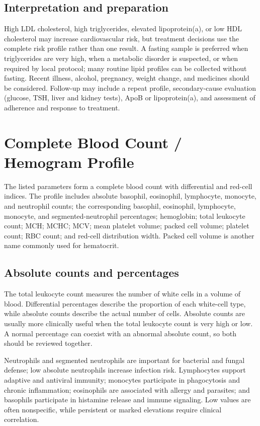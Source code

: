 \documentclass[11pt,openany]{book}
\begin{document}
\subsection*{Interpretation and preparation}
High LDL cholesterol, high triglycerides, elevated lipoprotein(a), or low HDL
cholesterol may increase cardiovascular risk, but treatment decisions use the
complete risk profile rather than one result. A fasting sample is preferred
when triglycerides are very high, when a metabolic disorder is suspected, or
when required by local protocol; many routine lipid profiles can be collected
without fasting. Recent illness, alcohol, pregnancy, weight change, and
medicines should be considered. Follow-up may include a repeat profile,
secondary-cause evaluation (glucose, TSH, liver and kidney tests), ApoB or
lipoprotein(a), and assessment of adherence and response to treatment.

\section{Complete Blood Count / Hemogram Profile}

The listed parameters form a complete blood count with differential and red-cell
indices. The profile includes absolute basophil, eosinophil, lymphocyte,
monocyte, and neutrophil counts; the corresponding basophil, eosinophil,
lymphocyte, monocyte, and segmented-neutrophil percentages; hemoglobin; total
leukocyte count; MCH; MCHC; MCV; mean platelet volume; packed cell volume;
platelet count; RBC count; and red-cell distribution width. Packed cell volume
is another name commonly used for hematocrit.

\subsection*{Absolute counts and percentages}
The total leukocyte count measures the number of white cells in a volume of
blood. Differential percentages describe the proportion of each white-cell
type, while absolute counts describe the actual number of cells. Absolute
counts are usually more clinically useful when the total leukocyte count is
very high or low. A normal percentage can coexist with an abnormal absolute
count, so both should be reviewed together.

Neutrophils and segmented neutrophils are important for bacterial and fungal
defense; low absolute neutrophils increase infection risk. Lymphocytes support
adaptive and antiviral immunity; monocytes participate in phagocytosis and
chronic inflammation; eosinophils are associated with allergy and parasites;
and basophils participate in histamine release and immune signaling. Low values
are often nonspecific, while persistent or marked elevations require clinical
correlation.
\end{document}
